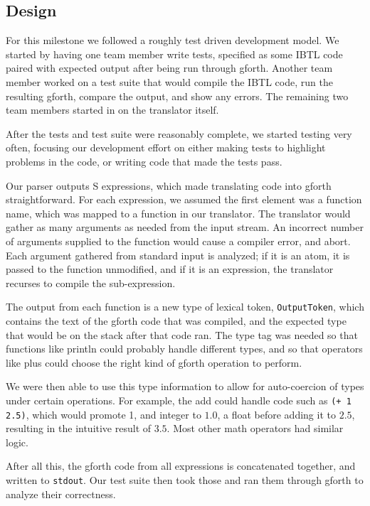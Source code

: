 \documentclass[12pt]{article}
\begin{document}
\subsection{Design}

For this milestone we followed a roughly test driven development model. We
started by having one team member write tests, specified as some IBTL code
paired with expected output after being run through gforth. Another team member
worked on a test suite that would compile the IBTL code, run the resulting
gforth, compare the output, and show any errors. The remaining two team members
started in on the translator itself.

After the tests and test suite were reasonably complete, we started testing
very often, focusing our development effort on either making tests to highlight
problems in the code, or writing code that made the tests pass.

Our parser outputs S expressions, which made translating code into gforth
straightforward. For each expression, we assumed the first element was a
function name, which was mapped to a function in our translator. The translator
would gather as many arguments as needed from the input stream. An incorrect
number of arguments supplied to the function would cause a compiler error, and
abort. Each argument gathered from standard input is analyzed; if it is an
atom, it is passed to the function unmodified, and if it is an expression, the
translator recurses to compile the sub-expression.

The output from each function is a new type of lexical token,
\texttt{OutputToken}, which contains the text of the gforth code that was
compiled, and the expected type that would be on the stack after that code ran.
The type tag was needed so that functions like println could probably handle
different types, and so that operators like plus could choose the right kind of
gforth operation to perform.

We were then able to use this type information to allow for auto-coercion of
types under certain operations. For example, the add could handle code such as
\texttt{(+ 1 2.5)}, which would promote 1, and integer to $1.0$, a float before
adding it to $2.5$, resulting in the intuitive result of $3.5$. Most other math
operators had similar logic.

After all this, the gforth code from all expressions is concatenated together,
and written to \texttt{stdout}. Our test suite then took those and ran them
through gforth to analyze their correctness.
\end{document}
